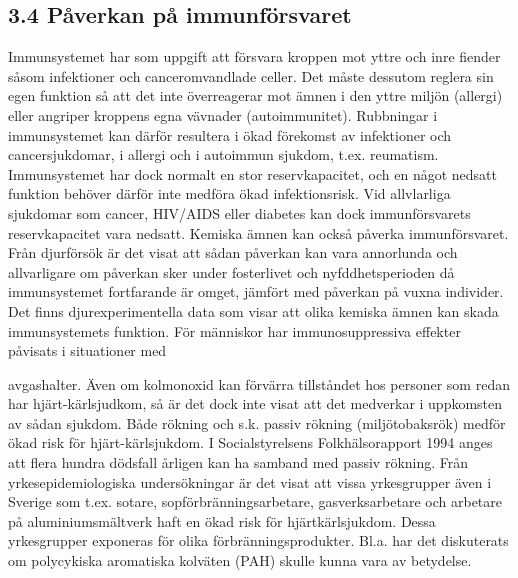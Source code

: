 \subsection*{3.4 Påverkan på immunförsvaret}
Immunsystemet har som uppgift att försvara kroppen mot yttre och inre fiender såsom infektioner och canceromvandlade celler. Det måste dessutom reglera sin egen funktion så att det inte överreagerar mot ämnen i den yttre miljön (allergi) eller angriper kroppens egna vävnader (autoimmunitet). Rubbningar i immunsystemet kan därför resultera i ökad förekomst av infektioner och cancersjukdomar, i allergi och i autoimmun sjukdom, t.ex. reumatism. Immunsystemet har dock normalt en stor reservkapacitet, och en något nedsatt funktion behöver därför inte medföra ökad infektionsrisk. Vid allvlarliga sjukdomar som cancer, HIV/AIDS eller diabetes kan dock immunförsvarets reservkapacitet vara nedsatt.
Kemiska ämnen kan också påverka immunförsvaret. Från djurförsök är det visat att sådan påverkan kan vara annorlunda och allvarligare om påverkan sker under fosterlivet och nyfddhetsperioden då immunsystemet fortfarande är omget, jämfört med påverkan på vuxna individer.
Det finns djurexperimentella data som visar att olika kemiska ämnen kan skada immunsystemets funktion. För människor har immunosuppressiva effekter påvisats i situationer med

avgashalter. Även om kolmonoxid kan förvärra tillståndet hos personer som redan har hjärt-kärlsjudkom, så är det dock inte visat att det medverkar i uppkomsten av sådan sjukdom.
Både rökning och s.k. passiv rökning (miljötobaksrök) medför ökad risk för hjärt-kärlsjukdom. I Socialstyrelsens Folkhälsorapport 1994 anges att flera hundra dödsfall årligen kan ha samband med passiv rökning. Från yrkesepidemiologiska undersökningar är det visat att vissa yrkesgrupper även i Sverige som t.ex. sotare, sopförbränningsarbetare, gasverksarbetare och arbetare på aluminiumsmältverk haft en ökad risk för hjärtkärlsjukdom. Dessa yrkesgrupper exponeras för olika förbränningsprodukter. Bl.a. har det diskuterats om polycykiska aromatiska kolväten (PAH) skulle kunna vara av betydelse.
